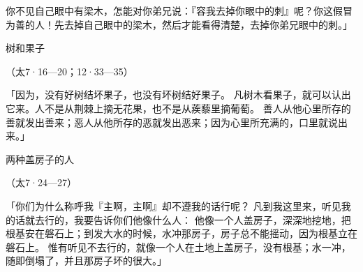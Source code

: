 {你不见自己眼中有梁木，怎能对你弟兄说：『容我去掉你眼中的刺』呢？你这假冒为善的人！先去掉自己眼中的梁木，然后才能看得清楚，去掉你弟兄眼中的刺。」
\par }{\SH 树和果子
\par }{\R （太7·16—20；12·33—35）
\par }{\PP {}「因为，没有好树结坏果子，也没有坏树结好果子。
凡树木看果子，就可以认出它来。人不是从荆棘上摘无花果，也不是从蒺藜里摘葡萄。
善人从他心里所存的善就发出善来；恶人从他{}所存的恶就发出恶来；因为心里所充满的，口里就说出来。」
\par }{\SH 两种盖房子的人
\par }{\R （太7·24—27）
\par }{\PP {}「你们为什么称呼我『主啊，主啊』却不遵我的话行呢？
凡到我这里来，听见我的话就去行的，我要告诉你们他像什么人：
他像一个人盖房子，深深地挖地，把根基安在磐石上；到发大水的时候，水冲那房子，房子总不能摇动，因为根基立在磐石上。
惟有听见不去行的，就像一个人在土地上盖房子，没有根基；水一冲，随即倒塌了，并且那房子坏的很大。」

}
